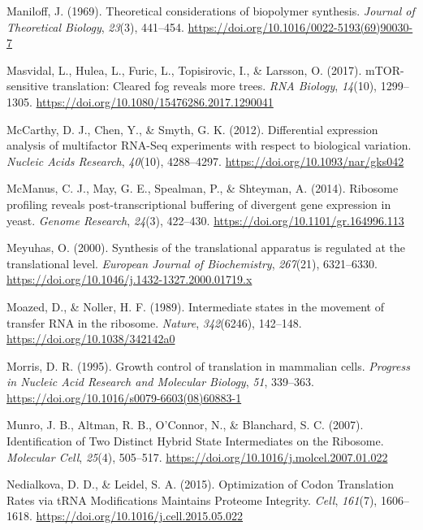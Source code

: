 \documentclass[12pt,openany]{book}
\begin{document}
\hypertarget{ref-Maniloff1969}{}
Maniloff, J. (1969). Theoretical considerations of biopolymer synthesis.
\emph{Journal of Theoretical Biology}, \emph{23}(3), 441--454.
\url{https://doi.org/10.1016/0022-5193(69)90030-7}

\hypertarget{ref-Masvidal2017}{}
Masvidal, L., Hulea, L., Furic, L., Topisirovic, I., \& Larsson, O.
(2017). mTOR-sensitive translation: Cleared fog reveals more trees.
\emph{RNA Biology}, \emph{14}(10), 1299--1305.
\url{https://doi.org/10.1080/15476286.2017.1290041}

\hypertarget{ref-McCarthy2012}{}
McCarthy, D. J., Chen, Y., \& Smyth, G. K. (2012). Differential
expression analysis of multifactor RNA-Seq experiments with respect to
biological variation. \emph{Nucleic Acids Research}, \emph{40}(10),
4288--4297. \url{https://doi.org/10.1093/nar/gks042}

\hypertarget{ref-McManus2014}{}
McManus, C. J., May, G. E., Spealman, P., \& Shteyman, A. (2014).
Ribosome profiling reveals post-transcriptional buffering of divergent
gene expression in yeast. \emph{Genome Research}, \emph{24}(3),
422--430. \url{https://doi.org/10.1101/gr.164996.113}

\hypertarget{ref-Meyuhas2000}{}
Meyuhas, O. (2000). Synthesis of the translational apparatus is
regulated at the translational level. \emph{European Journal of
Biochemistry}, \emph{267}(21), 6321--6330.
\url{https://doi.org/10.1046/j.1432-1327.2000.01719.x}

\hypertarget{ref-Moazed1989}{}
Moazed, D., \& Noller, H. F. (1989). Intermediate states in the movement
of transfer RNA in the ribosome. \emph{Nature}, \emph{342}(6246),
142--148. \url{https://doi.org/10.1038/342142a0}

\hypertarget{ref-Morris1995}{}
Morris, D. R. (1995). Growth control of translation in mammalian cells.
\emph{Progress in Nucleic Acid Research and Molecular Biology},
\emph{51}, 339--363. \url{https://doi.org/10.1016/s0079-6603(08)60883-1}

\hypertarget{ref-Munro2007}{}
Munro, J. B., Altman, R. B., O'Connor, N., \& Blanchard, S. C. (2007).
Identification of Two Distinct Hybrid State Intermediates on the
Ribosome. \emph{Molecular Cell}, \emph{25}(4), 505--517.
\url{https://doi.org/10.1016/j.molcel.2007.01.022}

\hypertarget{ref-Nedialkova2015}{}
Nedialkova, D. D., \& Leidel, S. A. (2015). Optimization of Codon
Translation Rates via tRNA Modifications Maintains Proteome Integrity.
\emph{Cell}, \emph{161}(7), 1606--1618.
\url{https://doi.org/10.1016/j.cell.2015.05.022}
\end{document}
